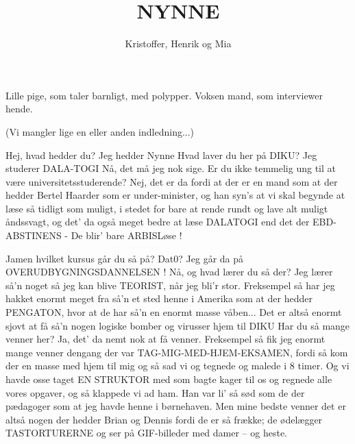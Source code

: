 \documentclass[a4paper,11pt]{article}
\title{NYNNE}
\author{Kristoffer, Henrik og Mia}
\begin{document}
\maketitle

\begin{roles}
 Lille pige, som taler barnligt, med polypper.
	  Voksen mand, som interviewer hende.
\end{roles}

\scene
(Vi mangler lige en eller anden indledning...)

\begin{sketch}

  Hej, hvad hedder du?
 Jeg hedder Nynne
  Hvad laver du her på DIKU?
 Jeg studerer DALA-TOGI
  Nå, det må jeg nok sige. Er du ikke temmelig ung til at være 
       universitetsstuderende?
 Nej, det er da fordi at der er en mand som at der hedder Bertel
       Haarder som er under-minister, og han syn's at vi skal begynde at
       læse så tidligt som muligt, i stedet for bare at rende rundt og 
       lave alt muligt åndssvagt, og det' da også meget bedre at læse 
       DALATOGI end det der EBD-ABSTINENS - De blir' bare ARBISLøse !
       
  Jamen hvilket kursus går du så på?  Dat0?
 Jeg går da på OVERUDBYGNINGSDANNELSEN !
  Nå, og hvad lærer du så der?
 Jeg lærer så'n noget så jeg kan blive TEORIST, når jeg bli'r stor.
       Freksempel så har jeg hakket enormt meget fra så'n et sted henne i 
       Amerika som at der hedder PENGATON, hvor at de har så'n en enormt 
       masse våben... Det er altså enormt sjovt at få så'n nogen logiske 
       bomber og virusser hjem til DIKU	       
  Har du så mange venner her?  
 Ja, det' da nemt nok at få venner. Freksempel så fik jeg enormt 
       mange venner dengang der var TAG-MIG-MED-HJEM-EKSAMEN, fordi så
       kom der en masse med hjem til mig og så sad vi og tegnede og malede 
       i 8 timer. Og vi havde osse taget EN STRUKTOR med som bagte kager til 
       os og regnede alle vores opgaver, og så klappede vi ad ham. Han var
       li' så sød som de der pædagoger som at jeg havde henne i børnehaven.
       Men mine bedste venner det er altså nogen der hedder Brian og Dennis
       fordi de er så frække; de ødelægger TASTORTURERNE og ser på
       GIF-billeder med damer -- og heste.


\end{sketch}
\end{document}
